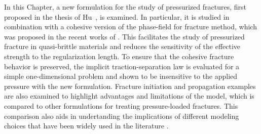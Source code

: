  
In this Chapter, a new formulation for the study of pressurized fractures, first proposed in the thesis of Hu~\cite{hu2021variationalthesis}, is examined. In particular, it is studied in combination with a cohesive version of the phase-field for fracture method, which was proposed in the recent works of \cite{lorentz2011convergence, geelen2019phase, wu2017unified}.  This facilitates the study of pressurized fracture in quasi-brittle materials and reduces the sensitivity of the effective strength to the regularization length. To ensure that the cohesive fracture behavior is preserved, the implicit traction-separation law is evaluated for a simple one-dimensional problem and shown to be insensitive to the applied pressure with the new formulation. Fracture initiation and propagation examples are also examined to highlight advantages and limitations of the model, which is compared to other formulations for treating pressure-loaded fractures. This comparison also aids in undertanding the implications of different modeling choices that have been widely used in the literature \cite{bourdin2012variational, wheeler2014augmented, mikelic2015quasi, peco2017influence, jiang2022phase}.  

